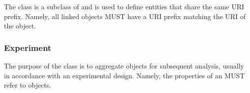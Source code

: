 The  class is a subclass of  and is used to define  entities that share the same URI prefix.  Namely, all linked objects MUST have a URI prefix matching the URI of the  object. 

\subsubsection{Experiment}
\label{sec:Experiment}

The purpose of the  class is to aggregate  objects for subsequent analysis, usually in accordance with an experimental design.  Namely, the  properties of an  MUST refer to  objects.


